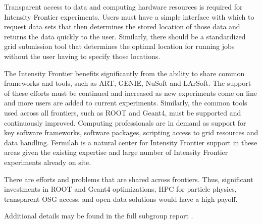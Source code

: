 Transparent access to data and computing hardware resources is required for Intensity Frontier
experiments.   Users must have a simple interface with which to request data
sets that then determines the stored location of those data and returns the
data quickly to the user.  Similarly, there should be a standardized grid
submission tool that determines the optimal location for running jobs without
the user having to specify those locations.

The Intensity Frontier benefits significantly from the ability to share common frameworks and
tools, such as ART, GENIE, NuSoft and LArSoft.  The support of these efforts
must be continued and increased as new experiments come on line and more users
are added to current experiments.  Similarly, the common tools used across all
frontiers, such as ROOT and Geant4, must be supported and continuously
improved. Computing professionals are in demand as support for key software
frameworks, software packages, scripting access to grid resources and data
handling. Fermilab is a natural center for Intensity Frontier support in these areas given the
existing expertise and large number of Intensity Frontier experiments already on site.

There are efforts and problems that are shared across frontiers.  Thus, significant
investments in ROOT and Geant4 optimizations, HPC for particle physics, 
transparent OSG access, and open data solutions would have a high payoff.

Additional details may be found in the full subgroup report \cite{Rebel:2013xaa}.
